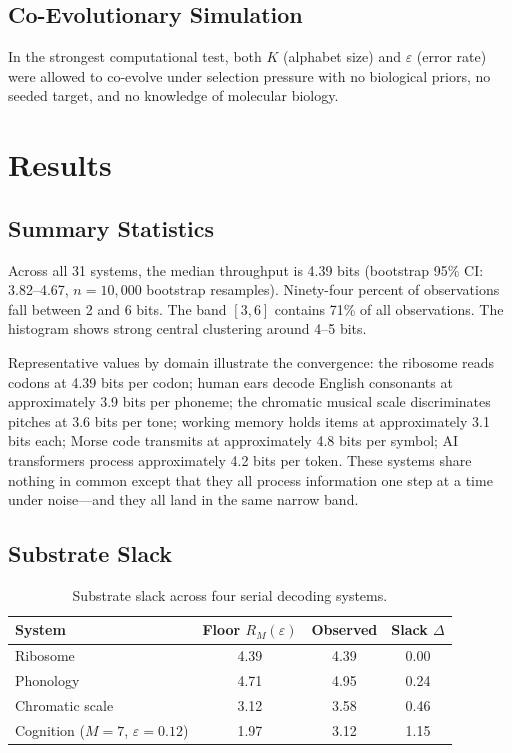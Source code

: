 \documentclass[11pt]{article}
\begin{document}
\subsection{Co-Evolutionary Simulation}

In the strongest computational test, both $K$ (alphabet size) and $\varepsilon$ (error rate) were allowed to co-evolve under selection pressure with no biological priors, no seeded target, and no knowledge of molecular biology.

\section{Results}

\subsection{Summary Statistics}

Across all 31 systems, the median throughput is 4.39 bits (bootstrap 95\% CI: 3.82--4.67, $n = 10{,}000$ bootstrap resamples). Ninety-four percent of observations fall between 2 and 6 bits. The band $[3, 6]$ contains 71\% of all observations. The histogram shows strong central clustering around 4--5 bits.

Representative values by domain illustrate the convergence: the ribosome reads codons at 4.39 bits per codon; human ears decode English consonants at approximately 3.9 bits per phoneme; the chromatic musical scale discriminates pitches at 3.6 bits per tone; working memory holds items at approximately 3.1 bits each; Morse code transmits at approximately 4.8 bits per symbol; AI transformers process approximately 4.2 bits per token. These systems share nothing in common except that they all process information one step at a time under noise---and they all land in the same narrow band.

\subsection{Substrate Slack}

\begin{table}[ht]
\centering
\caption{Substrate slack across four serial decoding systems.}
\label{tab:slack}
\begin{tabular}{lccc}
\toprule
System & Floor $R_M(\varepsilon)$ & Observed & Slack $\Delta$ \\
\midrule
Ribosome & 4.39 & 4.39 & 0.00 \\
Phonology & 4.71 & 4.95 & 0.24 \\
Chromatic scale & 3.12 & 3.58 & 0.46 \\
Cognition ($M=7$, $\varepsilon=0.12$) & 1.97 & 3.12 & 1.15 \\
\bottomrule
\end{tabular}
\end{table}
\end{document}
